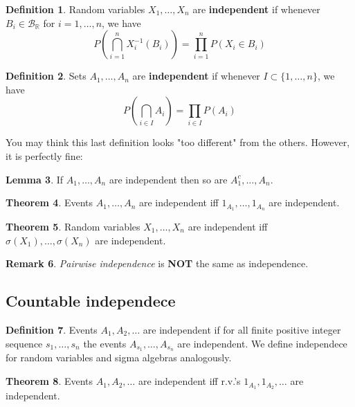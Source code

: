 \documentclass{article}
\theoremstyle{definition}
\newtheorem{theorem}{Theorem}[section]
\newtheorem{lemma}[theorem]{Lemma}
\newtheorem{definition}[theorem]{Definition}
\newtheorem{remark}[theorem]{Remark}
\begin{document}
\begin{definition}

    Random variables $X_1, \ldots, X_n$ are \textbf{independent} if whenever $B_i \in \mathcal{B}_\mathbb{R}$ for $i = 1, \ldots, n$, we have
    \[
        P\left(\bigcap_{i=1}^n X_i^{-1}(B_i)\right) = \prod_{i=1}^n P(X_i \in B_i)
    \]
\end{definition}

\begin{definition}

    Sets $A_1, \ldots, A_n$ are \textbf{independent} if whenever $I \subset \{1, \ldots, n\}$, we have
    \[
        P\left(\bigcap_{i \in I} A_i\right) = \prod_{i \in I} P(A_i)
    \]
\end{definition}

You may think this last definition looks "too different" from the others. However, it is perfectly fine:

\begin{lemma}
    If $A_1, \dots, A_n$ are independent then so are $A_1^c, \dots, A_n$.
\end{lemma}

\begin{theorem}
    Events $A_1, \dots, A_n$ are independent iff $1_{A_1}, \dots, 1_{A_n}$ are independent.
\end{theorem}

\begin{theorem}
    Random variables $X_1, \dots, X_n$ are independent iff $\sigma(X_1), \dots, \sigma(X_n)$ are independent.
\end{theorem}

\begin{remark}
    \emph{Pairwise independence} is \textbf{NOT} the same as independence.
\end{remark}

\subsection{Countable independece}

\begin{definition}
    Events $A_1, A_2, \dots$ are independent if for all finite positive integer sequence $s_1, \dots, s_n$ the events $A_{s_1}, \dots, A_{s_n}$ are independent. We define independece for random variables and sigma algebras analogously.
\end{definition}

\begin{theorem}
    Events $A_1, A_2, \dots$ are independent iff r.v.'s $1_{A_1}, 1_{A_2}, \dots$ are independent.
\end{theorem}
\end{document}
